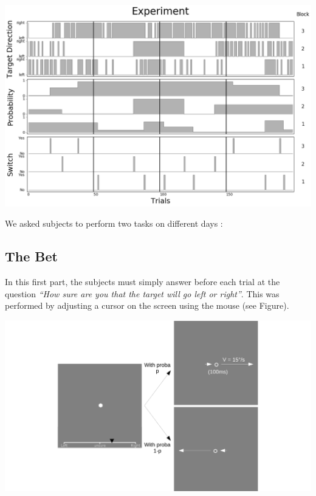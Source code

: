 \documentclass[profile,final,english, draft]{article}%
\begin{document}
\begin{center} 
    \includegraphics[width=1\linewidth]{exp}
\end{center}

We asked subjects to perform two tasks on different days :

\subsection*{The Bet}
In this first part, the subjects must simply answer before each trial at the question \textit{ ``How sure are you that the target will go left or right''}. This was performed by adjusting a cursor on the screen using the mouse (see Figure).
\begin{center} 
    \includegraphics[width=1\linewidth]{materiel_bet}
\end{center}
\end{document}
